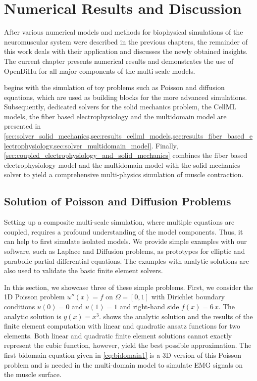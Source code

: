 \chapter{Numerical Results and Discussion}\label{sec:results}

After various numerical models and methods for biophysical simulations of the neuromuscular system were described in the previous chapters, the remainder of this work deals with their application and discusses the newly obtained insights.
The current chapter presents numerical results and demonstrates the use of OpenDiHu for all major components of the multi-scale models. 

 begins with the simulation of toy problems such as Poisson and diffusion equations, which are used as building blocks for the more advanced simulations. Subsequently, dedicated solvers for the solid mechanics problem, the CellML models, the fiber based electrophysiology and the multidomain model are presented in \cref{sec:solver_solid_mechanics,sec:results_cellml_models,sec:results_fiber_based_electrophysiology,sec:solver_multidomain_model}. Finally, \cref{sec:coupled_electrophysiology_and_solid_mechanics} combines the fiber based electrophysiology model and the multidomain model with the solid mechanics solver to yield a comprehensive multi-physics simulation of muscle contraction.

%

\section{Solution of Poisson and Diffusion Problems}\label{sec:poisson_diffusion}

Setting up a composite multi-scale simulation, where multiple equations are coupled, requires a profound understanding of the model components. 
Thus, it can help to first simulate isolated models. We provide simple examples with our software, such as Laplace and Diffusion problems, as prototypes for elliptic and parabolic partial differential equations. The examples with analytic solutions are also used to validate the basic finite element solvers.

In this section, we showcase three of these simple problems. First, we consider the 1D Poisson problem $u''(x) = f$ on $\Omega=[0,1]$ with Dirichlet boundary conditions $u(0)=0$ and $u(1)=1$ and right-hand side $f(x)=6\,x$. The analytic solution is $y(x)=x^3$.  shows the analytic solution and the results of the finite element computation with linear and quadratic ansatz functions for two elements. Both linear and quadratic finite element solutions cannot exactly represent the cubic function, however, yield the best possible approximation. 
The first bidomain equation given in \cref{eq:bidomain1} is a 3D version of this Poisson problem and is needed in the multi-domain model to simulate EMG signals on the muscle surface.

